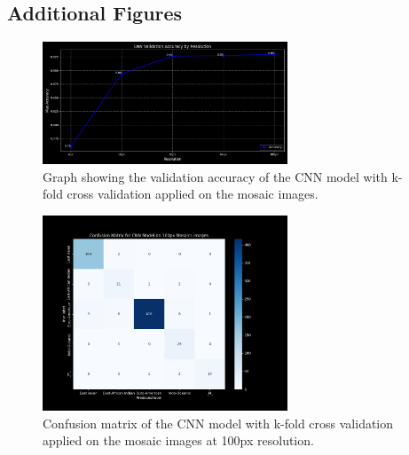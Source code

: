 \begin{appendices}

	\chapter{Additional Figures}
	\label{app:additional_figures}


	\begin{figure}[H]
		\centering
		\includegraphics[width=0.65\textwidth]{../imgs/graphs/kfold/cnn_validation_accuracy_kfold_mosaics_line_mask_5_std.png}
		\caption{Graph showing the validation accuracy of the CNN model with k-fold cross validation applied on the mosaic images.}
		\label{fig:kfold_accuracy_mosaic}
	\end{figure}

	\begin{figure}[H]
		\centering
		\includegraphics[width=0.65\textwidth]{../imgs/graphs/kfold/cnn_confusion_matrix_kfold_mosaics_100px_mask_5_std.png}
		\caption{Confusion matrix of the CNN model with k-fold cross validation applied on the mosaic images at 100px resolution.}
		\label{fig:kfold_confusion_matrix_mosaic}
	\end{figure}



\end{appendices}
